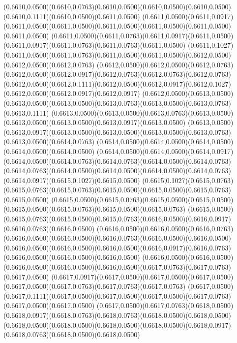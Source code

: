 (0.6610,0.0500)(0.6610,0.0763)(0.6610,0.0500)(0.6610,0.0500)(0.6610,0.0500)(0.6610,0.1111)(0.6610,0.0500)(0.6611,0.0500)
(0.6611,0.0500)(0.6611,0.0917)(0.6611,0.0500)(0.6611,0.0500)(0.6611,0.0500)(0.6611,0.0500)(0.6611,0.0500)(0.6611,0.0500)
(0.6611,0.0500)(0.6611,0.0763)(0.6611,0.0917)(0.6611,0.0500)(0.6611,0.0917)(0.6611,0.0763)(0.6611,0.0763)(0.6611,0.0500)
(0.6611,0.1027)(0.6611,0.0500)(0.6611,0.0763)(0.6611,0.0500)(0.6611,0.0500)(0.6612,0.0500)(0.6612,0.0500)(0.6612,0.0763)
(0.6612,0.0500)(0.6612,0.0500)(0.6612,0.0763)(0.6612,0.0500)(0.6612,0.0917)(0.6612,0.0763)(0.6612,0.0763)(0.6612,0.0763)
(0.6612,0.0500)(0.6612,0.1111)(0.6612,0.0500)(0.6612,0.0917)(0.6612,0.1027)(0.6612,0.0500)(0.6612,0.0917)(0.6612,0.0917)
(0.6612,0.0500)(0.6613,0.0500)(0.6613,0.0500)(0.6613,0.0500)(0.6613,0.0763)(0.6613,0.0500)(0.6613,0.0763)(0.6613,0.1111)
(0.6613,0.0500)(0.6613,0.0500)(0.6613,0.0763)(0.6613,0.0500)(0.6613,0.0500)(0.6613,0.0500)(0.6613,0.0917)(0.6613,0.0500)
(0.6613,0.0500)(0.6613,0.0917)(0.6613,0.0500)(0.6613,0.0500)(0.6613,0.0500)(0.6613,0.0763)(0.6613,0.0500)(0.6614,0.0763)
(0.6614,0.0500)(0.6614,0.0500)(0.6614,0.0500)(0.6614,0.0500)(0.6614,0.0500)
\PST@Solid(0.6614,0.0500)(0.6614,0.0500)(0.6614,0.0917)(0.6614,0.0500)(0.6614,0.0763)(0.6614,0.0763)(0.6614,0.0500)(0.6614,0.0763)
(0.6614,0.0763)(0.6614,0.0500)(0.6614,0.0500)(0.6614,0.0500)(0.6614,0.0763)(0.6614,0.0917)(0.6615,0.1027)(0.6615,0.0500)
(0.6615,0.1027)(0.6615,0.0763)(0.6615,0.0763)(0.6615,0.0763)(0.6615,0.0500)(0.6615,0.0500)(0.6615,0.0763)(0.6615,0.0500)
(0.6615,0.0500)(0.6615,0.0763)(0.6615,0.0500)(0.6615,0.0500)(0.6615,0.0500)(0.6615,0.0763)(0.6615,0.0500)(0.6615,0.0763)
(0.6615,0.0500)(0.6615,0.0763)(0.6615,0.0500)(0.6615,0.0763)(0.6616,0.0500)(0.6616,0.0917)(0.6616,0.0763)(0.6616,0.0500)
(0.6616,0.0500)(0.6616,0.0500)(0.6616,0.0763)(0.6616,0.0500)(0.6616,0.0500)(0.6616,0.0763)(0.6616,0.0500)(0.6616,0.0500)
(0.6616,0.0500)(0.6616,0.0500)(0.6616,0.0500)(0.6616,0.0917)(0.6616,0.0763)(0.6616,0.0500)(0.6616,0.0500)(0.6616,0.0500)
(0.6616,0.0500)(0.6616,0.0500)(0.6616,0.0500)(0.6616,0.0500)(0.6616,0.0500)(0.6617,0.0763)(0.6617,0.0763)(0.6617,0.0500)
(0.6617,0.0917)(0.6617,0.0500)(0.6617,0.0500)(0.6617,0.0500)(0.6617,0.0500)(0.6617,0.0763)(0.6617,0.0763)(0.6617,0.0763)
(0.6617,0.0500)(0.6617,0.1111)(0.6617,0.0500)(0.6617,0.0500)(0.6617,0.0500)(0.6617,0.0763)(0.6617,0.0500)(0.6617,0.0500)
(0.6617,0.0500)(0.6617,0.0763)(0.6618,0.0500)(0.6618,0.0917)(0.6618,0.0763)(0.6618,0.0763)(0.6618,0.0500)(0.6618,0.0500)
(0.6618,0.0500)(0.6618,0.0500)(0.6618,0.0500)(0.6618,0.0500)(0.6618,0.0917)(0.6618,0.0763)(0.6618,0.0500)(0.6618,0.0500)
